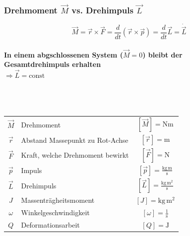 		\subsubsection{Drehmoment $\vec{M}$ vs. Drehimpuls $\vec{L}$}
			$$ \boxed{ \vec{M} = \vec{r} \times \vec{F} = \frac{d}{dt} (\vec{r} \times \vec{p}) =  \frac{d}{dt} \vec{L} = \dot{\vec{L}} }$$ \\
			
			\textbf{In einem abgschlossenen System ($\vec{M} = 0$) bleibt der \\
			Gesamtdrehimpuls erhalten} \\
			$\Rightarrow \vec{L} = \text{const}$ \\
			\\
			\\
			\\
			\begin{tabular}{c l c}
				$\vec{M}$ & Drehmoment & $[\vec{M}] = \mathrm{Nm}$ \\
				$\vec{r}$ & Abstand Massepunkt zu Rot-Achse & $[\vec{r}] = \mathrm{m}$ \\
				$\vec{F}$ & Kraft, welche Drehmoment bewirkt & $[\vec{F}] = \mathrm{N}$ \\
				$\vec{p}$ & Impuls & $[\vec{p}] = \mathrm{\frac{kg \, m}{s}}$ \\
				$\vec{L}$ & Drehimpuls & $[\vec{L}] = \mathrm{\frac{kg \, m^2}{s}}$ \\
				$J$  & Massenträgheitsmoment & $[J] = \mathrm{kg \, m^2}$ \\
				$\omega$ & Winkelgeschwindigkeit & $[\omega] = \mathrm{\frac{1}{s}}$ \\
				$Q$ & Deformationsarbeit & $[Q] = \mathrm{J}$ \\
			\end{tabular}

